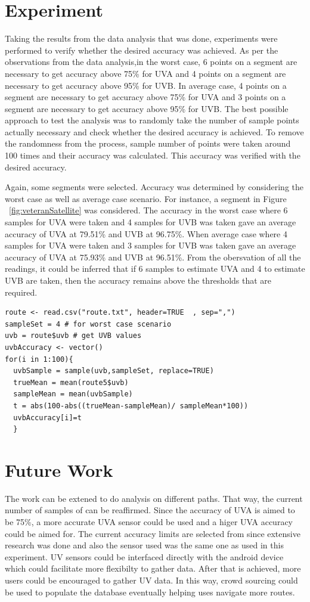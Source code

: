 \documentclass[10pt]{sigplan-proc-varsize}
\begin{document}
\section{Experiment}
Taking the results from the data analysis that was done, experiments were performed to verify whether the desired accuracy was achieved. As per the observations from the data analysis,in the worst case, 6 points on a segment are necessary to get accuracy above 75\% for UVA and 4 points on a segment are necessary to get accuracy above 95\% for UVB.
In average case, 4 points on a segment are necessary to get accuracy above 75\% for UVA and  3 points on a segment are necessary to get accuracy above 95\% for UVB. The best possible approach to test the analysis was to randomly take the number of sample points actually necessary and check whether the desired accuracy is achieved. To remove the randomness from the process, sample number of points were taken around 100 times and their accuracy was calculated. This accuracy was verified with the desired accuracy. 

Again, some segments were selected. Accuracy was determined by considering the worst case as well as average case scenario. For instance, a segment in Figure ~\ref{fig:veteranSatellite} was considered. The accuracy in the worst case where 6 samples for UVA were taken and 4 samples for UVB was taken gave an average accuracy of UVA at 79.51\% and UVB at 96.75\%. When average case where 4 samples for UVA were taken and 3 samples for UVB was taken gave an average accuracy of UVA at 75.93\% and UVB at 96.51\%. From the obersvation of all the readings, it could be inferred that if 6 samples to estimate UVA and 4 to estimate UVB are taken, then the accuracy remains above the thresholds that are required.
\lstset{ tabsize=4,      caption=R Code for verifying accuracy,breaklines=true,
        frame=single}
\begin{lstlisting}
route <- read.csv("route.txt", header=TRUE  , sep=",")
sampleSet = 4 # for worst case scenario
uvb = route$uvb # get UVB values
uvbAccuracy <- vector()
for(i in 1:100){
  uvbSample = sample(uvb,sampleSet, replace=TRUE)
  trueMean = mean(route5$uvb)
  sampleMean = mean(uvbSample)
  t = abs(100-abs((trueMean-sampleMean)/ sampleMean*100))
  uvbAccuracy[i]=t
  }
\end{lstlisting}

\section{Future Work}
The work can be extened to do analysis on different paths. That way, the current number of samples of can be reaffirmed. Since the accuracy of UVA is aimed to be 75\%, a more accurate UVA sensor could be used and a higer UVA accuracy could be aimed for. The current accuracy limits are selected from \cite{uvguardian} since extensive research was done and also the sensor used was the same one as used in this experiment. UV sensors could be interfaced directly with the android device which could facilitate more flexibilty to gather data. After that is achieved, more users could be encouraged to gather UV data. In this way, crowd sourcing could be used to populate the database eventually helping uses navigate more routes.
\end{document}
